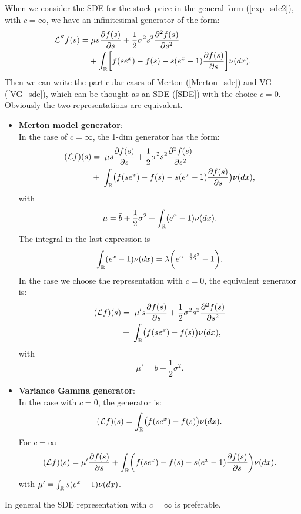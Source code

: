 When we consider the SDE for the stock price in the general form (\ref{exp_sde2}), with $c=\infty$, we have an infinitesimal generator of the form:
\begin{align}\label{inf_gen_exp_levy}
 \mathcal{L}^S f(s) =& \; \mu s \frac{\partial f(s)}{\partial s}
+ \frac{1}{2} \sigma^2 s^2 \frac{\partial^2  f(s)}{\partial s^2}  \\ \nonumber
&+ \int_{\mathbb{R}} \biggl[ f(se^x) - f(s) - s(e^x-1)\frac{\partial f(s)}{\partial s} \biggr] \nu(dx).
\end{align}
Then we can write the particular
cases of Merton (\ref{Merton_sde}) and VG (\ref{VG_sde}), which can be thought as an SDE (\ref{SDE}) with the choice $c=0$. \\
Obviously the two representations are equivalent.
\begin{itemize}
 \item \textbf{Merton model generator}:\\
 In the case of $c=\infty$, the 1-dim generator has the form:  
 \begin{align}\label{Merton_gen}
  (\mathcal{L} f)(s)  &= \;  \mu s \frac{\partial f(s)}{\partial s} + \frac{1}{2} \sigma^2 s^2 \frac{\partial^2 f(s)}{\partial s^2} \\ \nonumber
  &+ \; \int_{\mathbb{R}} \bigl( f(s e^x) - f(s) - s(e^x-1)\frac{\partial f(s)}{\partial s} \bigr) \nu(dx), 
 \end{align}
with $$ \mu = \bar b + \frac{1}{2}\sigma^2 + \int_{\mathbb{R}} ( e^{x} - 1 ) \nu(dx). $$
The integral in the last expression is 
\begin{align*}
 \int_{\mathbb{R}} ( e^{x} - 1 ) \nu(dx) = \lambda \biggl( e^{\alpha + \frac{1}{2} \xi^2} -1 \biggr).
\end{align*}
In the case we choose the representation with $c=0$, the equivalent generator is:
 \begin{align}\label{Merton_gen}
  (\mathcal{L} f)(s)  &= \;  \mu's \frac{\partial f(s)}{\partial s} + \frac{1}{2} \sigma^2 s^2 \frac{\partial^2 f(s)}{\partial s^2} \\ \nonumber
  &+ \; \int_{\mathbb{R}} \bigl( f(se^x) - f(s) \bigr) \nu(dx), 
 \end{align}
with $$ \mu' = \bar b + \frac{1}{2}\sigma^2. $$
 \item \textbf{Variance Gamma generator}:\\
 In the case with $c = 0$, the generator is:
 \begin{equation}\label{VG_gen}
  (\mathcal{L} f)(s) = \int_{\mathbb{R}} \bigl( f(se^x) - f(s) \bigr) \nu(dx).
 \end{equation}
 \newline
 For $c = \infty$ 
 \begin{equation*}
  (\mathcal{L} f)(s) = \mu' \frac{\partial f(s)}{\partial s} 
  + \int_{\mathbb{R}} \biggl( f(s e^x) - f(s) - s(e^x-1)\frac{\partial f(s)}{\partial s} \biggr) \nu(dx).
 \end{equation*}
 with $\mu' = \int_{\mathbb{R}} s(e^x-1)\nu(dx)$.
\end{itemize}
In general the SDE representation with $c = \infty$ is preferable. 

